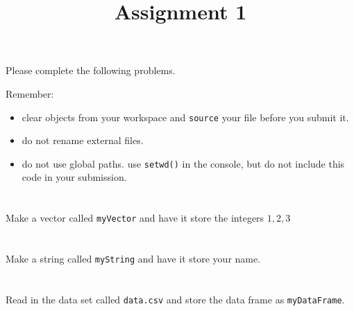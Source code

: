 \documentclass{article}
\title{Assignment 1}
\begin{document}
\maketitle

Please complete the following problems.
\newline

Remember:
\begin{itemize}
\item clear objects from your workspace and \verb|source| your file before you submit it. 
\item do not rename external files.
\item do not use global paths. use \verb|setwd()| in the console, but do not include this code in your submission.
\end{itemize}


\section{}
Make a vector called \verb|myVector| and have it store the integers $1,2,3$


\section{}
Make a string called \verb|myString| and have it store your name.

\section{}
Read in the data set called \verb|data.csv| and store the data frame as \verb|myDataFrame|.
\end{document}
